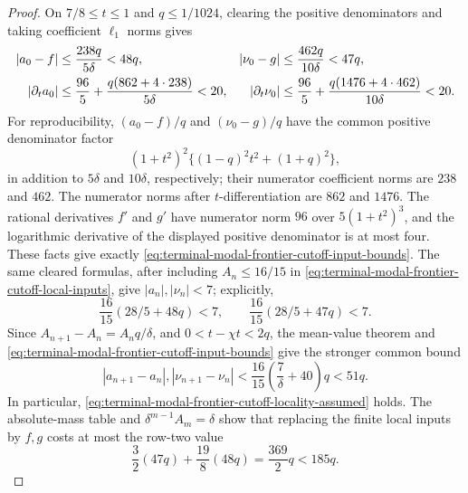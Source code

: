\begin{proof}
On $7/8\le t\le1$ and $q\le1/1024$, clearing the positive denominators and
taking coefficient $\ell_1$ norms gives
\begin{align}
 |a_0-f|&\le\frac{238q}{5\delta}<48q,&
 |\nu_0-g|&\le\frac{462q}{10\delta}<47q,\notag\\
 |\partial_ta_0|&\le\frac{96}{5}
 +\frac{q(862+4\cdot238)}{5\delta}<20,&
 |\partial_t\nu_0|&\le\frac{96}{5}
 +\frac{q(1476+4\cdot462)}{10\delta}<20.
 \label{eq:terminal-modal-frontier-cutoff-input-bounds}
\end{align}
For reproducibility, $(a_0-f)/q$ and $(\nu_0-g)/q$ have the common positive
denominator factor
\[
 (1+t^2)^2\{(1-q)^2t^2+(1+q)^2\},
\]
in addition to $5\delta$ and $10\delta$, respectively; their numerator
coefficient norms are $238$ and $462$.  The numerator norms after
$t$-differentiation are $862$ and $1476$.  The rational derivatives $f'$ and
$g'$ have numerator norm $96$ over $5(1+t^2)^3$, and the logarithmic
derivative of the displayed positive denominator is at most four.  These
facts give exactly \eqref{eq:terminal-modal-frontier-cutoff-input-bounds}.
The same cleared formulas, after including $A_n\le16/15$ in
\eqref{eq:terminal-modal-frontier-cutoff-local-inputs}, give
$|a_n|,|\nu_n|<7$; explicitly,
\[
 \frac{16}{15}(28/5+48q)<7,
 \qquad \frac{16}{15}(28/5+47q)<7.
\]
Since
$A_{n+1}-A_n=A_nq/\delta$, and $0<t-\chi t<2q$, the mean-value theorem and
\eqref{eq:terminal-modal-frontier-cutoff-input-bounds} give the stronger
common bound
\[
 |a_{n+1}-a_n|,|\nu_{n+1}-\nu_n|
 <\frac{16}{15}\left(\frac7\delta+40\right)q<51q.
\]
In particular, \eqref{eq:terminal-modal-frontier-cutoff-locality-assumed}
holds.  The absolute-mass table and
$\delta^{m-1}A_m=\delta$ show that replacing the finite local inputs by
$f,g$ costs at most the row-two value
\begin{equation}
 \frac32(47q)+\frac{19}{8}(48q)=\frac{369}{2}q<185q.
 \label{eq:terminal-modal-frontier-cutoff-local-input-loss}
\end{equation}


\end{proof}
